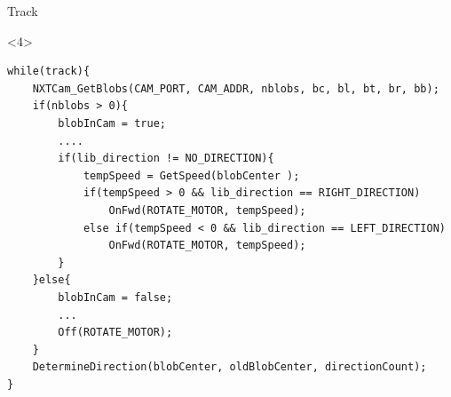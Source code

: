 \begin{frame}[fragile]{Track}
\begin{onlyenv}<4>
\begin{center}
\begin{minipage}[H]{0.9\linewidth}
\begin{lstlisting}
while(track){
	NXTCam_GetBlobs(CAM_PORT, CAM_ADDR, nblobs, bc, bl, bt, br, bb);
    if(nblobs > 0){
    	blobInCam = true;
        ....
        if(lib_direction != NO_DIRECTION){
        	tempSpeed = GetSpeed(blobCenter );
            if(tempSpeed > 0 && lib_direction == RIGHT_DIRECTION)
            	OnFwd(ROTATE_MOTOR, tempSpeed);
            else if(tempSpeed < 0 && lib_direction == LEFT_DIRECTION)
            	OnFwd(ROTATE_MOTOR, tempSpeed);
        }
	}else{
    	blobInCam = false;
        ...
    	Off(ROTATE_MOTOR);
	}
    DetermineDirection(blobCenter, oldBlobCenter, directionCount);
}
\end{lstlisting} 
\end{minipage}
\end{center}
\end{onlyenv}
\end{frame}

